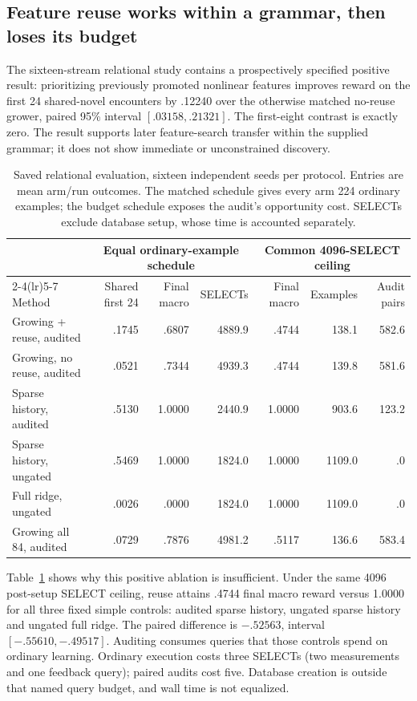 \documentclass[10pt,twocolumn]{article}
\begin{document}
\subsection{Feature reuse works within a grammar, then loses its budget}
The sixteen-stream relational study contains a prospectively specified positive
result: prioritizing previously promoted nonlinear features improves reward on
the first 24 shared-novel encounters by .12240 over the otherwise matched
no-reuse grower, paired 95\% interval $[.03158,.21321]$. The first-eight contrast
is exactly zero. The result supports later feature-search transfer within the
supplied grammar; it does not show immediate or unconstrained discovery.

\begin{table}[t]
\centering\small
\begin{tabular}{lrrrrrr}
\toprule
& \multicolumn{3}{c}{Equal ordinary-example schedule} &
\multicolumn{3}{c}{Common 4096-SELECT ceiling}\\
\cmidrule(lr){2-4}\cmidrule(lr){5-7}
Method & Shared first 24 & Final macro & SELECTs & Final macro & Examples & Audit pairs\\
\midrule
Growing + reuse, audited & .1745 & .6807 & 4889.9 & .4744 & 138.1 & 582.6\\
Growing, no reuse, audited & .0521 & .7344 & 4939.3 & .4744 & 139.8 & 581.6\\
Sparse history, audited & .5130 & 1.0000 & 2440.9 & 1.0000 & 903.6 & 123.2\\
Sparse history, ungated & .5469 & 1.0000 & 1824.0 & 1.0000 & 1109.0 & .0\\
Full ridge, ungated & .0026 & .0000 & 1824.0 & 1.0000 & 1109.0 & .0\\
Growing all 84, audited & .0729 & .7876 & 4981.2 & .5117 & 136.6 & 583.4\\
\bottomrule
\end{tabular}
\caption{Saved relational evaluation, sixteen independent seeds per protocol.
Entries are mean arm/run outcomes. The matched schedule gives every arm 224
ordinary examples; the budget schedule exposes the audit's opportunity cost.
SELECTs exclude database setup, whose time is accounted separately.}\label{tab:relational}
\end{table}

Table~\ref{tab:relational} shows why this positive ablation is insufficient.
Under the same 4096 post-setup SELECT ceiling, reuse attains .4744 final macro
reward versus 1.0000 for all three fixed simple controls: audited sparse
history, ungated sparse history and ungated full ridge. The paired difference
is $-.52563$, interval $[-.55610,-.49517]$. Auditing consumes queries that those
controls spend on ordinary learning. Ordinary execution costs three SELECTs
(two measurements and one feedback query); paired audits cost five. Database
creation is outside that named query budget, and wall time is not equalized.
\end{document}
